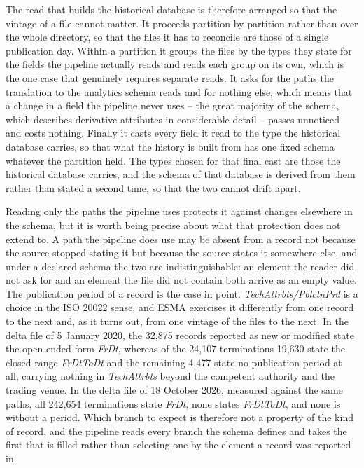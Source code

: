 The read that builds the historical database is therefore arranged so that the vintage of a file cannot matter. It proceeds partition by partition rather than over the whole directory, so that the files it has to reconcile are those of a single publication day. Within a partition it groups the files by the types they state for the fields the pipeline actually reads and reads each group on its own, which is the one case that genuinely requires separate reads. It asks for the paths the translation to the analytics schema reads and for nothing else, which means that a change in a field the pipeline never uses -- the great majority of the schema, which describes derivative attributes in considerable detail -- passes unnoticed and costs nothing. Finally it casts every field it read to the type the historical database carries, so that what the history is built from has one fixed schema whatever the partition held. The types chosen for that final cast are those the historical database carries, and the schema of that database is derived from them rather than stated a second time, so that the two cannot drift apart.

Reading only the paths the pipeline uses protects it against changes elsewhere in the schema, but it is worth being precise about what that protection does not extend to. A path the pipeline does use may be absent from a record not because the source stopped stating it but because the source states it somewhere else, and under a declared schema the two are indistinguishable: an element the reader did not ask for and an element the file did not contain both arrive as an empty value. The publication period of a record is the case in point. \emph{TechAttrbts/PblctnPrd} is a choice in the ISO 20022 sense, and ESMA exercises it differently from one record to the next and, as it turns out, from one vintage of the files to the next. In the delta file of 5 January 2020, the 32,875 records reported as new or modified state the open-ended form \emph{FrDt}, whereas of the 24,107 terminations 19,630 state the closed range \emph{FrDtToDt} and the remaining 4,477 state no publication period at all, carrying nothing in \emph{TechAttrbts} beyond the competent authority and the trading venue. In the delta file of 18 October 2026, measured against the same paths, all 242,654 terminations state \emph{FrDt}, none states \emph{FrDtToDt}, and none is without a period. Which branch to expect is therefore not a property of the kind of record, and the pipeline reads every branch the schema defines and takes the first that is filled rather than selecting one by the element a record was reported in.

